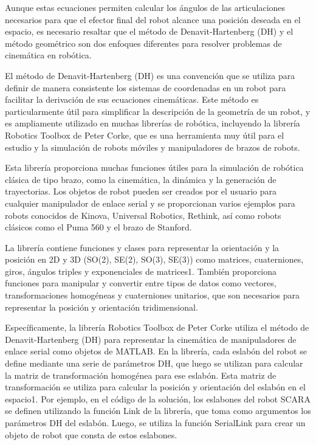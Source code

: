 \documentclass[final]{foresj}
\begin{document}
Aunque estas ecuaciones permiten calcular los ángulos de las articulaciones necesarios para que el efector final del robot alcance una posición deseada en el espacio, es necesario resaltar que el método de Denavit-Hartenberg (DH) y el método geométrico son dos enfoques diferentes para resolver problemas de cinemática en robótica.

El método de Denavit-Hartenberg (DH) es una convención que se utiliza para definir de manera consistente los sistemas de coordenadas en un robot para facilitar la derivación de sus ecuaciones cinemáticas. Este método es particularmente útil para simplificar la descripción de la geometría de un robot, y es ampliamente utilizado en muchas librerías de robótica, incluyendo la librería Robotics Toolbox de Peter Corke, que es una herramienta muy útil para el estudio y la simulación de robots móviles y manipuladores de brazos de robots.

Esta librería proporciona muchas funciones útiles para la simulación de robótica clásica de tipo brazo, como la cinemática, la dinámica y la generación de trayectorias. Los objetos de robot pueden ser creados por el usuario para cualquier manipulador de enlace serial y se proporcionan varios ejemplos para robots conocidos de Kinova, Universal Robotics, Rethink, así como robots clásicos como el Puma 560 y el brazo de Stanford.

La librería contiene funciones y clases para representar la orientación y la posición en 2D y 3D (SO(2), SE(2), SO(3), SE(3)) como matrices, cuaterniones, giros, ángulos triples y exponenciales de matrices1. También proporciona funciones para manipular y convertir entre tipos de datos como vectores, transformaciones homogéneas y cuaterniones unitarios, que son necesarios para representar la posición y orientación tridimensional.

Específicamente, la librería Robotics Toolbox de Peter Corke utiliza el método de Denavit-Hartenberg (DH) para representar la cinemática de manipuladores de enlace serial como objetos de MATLAB. En la librería, cada eslabón del robot se define mediante una serie de parámetros DH, que luego se utilizan para calcular la matriz de transformación homogénea para ese eslabón. Esta matriz de transformación se utiliza para calcular la posición y orientación del eslabón en el espacio1. Por ejemplo, en el código de la solución, los eslabones del robot SCARA se definen utilizando la función Link de la librería, que toma como argumentos los parámetros DH del eslabón. Luego, se utiliza la función SerialLink para crear un objeto de robot que consta de estos eslabones.
\end{document}
